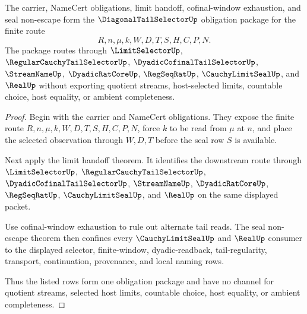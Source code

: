 \begin{theorem}
\label{thm:diagonal-tail-selector-obligation-closure-package}
The carrier, NameCert obligations, limit handoff, cofinal-window exhaustion,
and seal non-escape form the $\DiagonalTailSelectorUp$ obligation package for
the finite route
$$
R,n,\mu,k,W,D,T,S,H,C,P,N.
$$
The package routes through $\LimitSelectorUp$,
$\RegularCauchyTailSelectorUp$, $\DyadicCofinalTailSelectorUp$,
$\StreamNameUp$, $\DyadicRatCoreUp$, $\RegSeqRatUp$,
$\CauchyLimitSealUp$, and $\RealUp$ without exporting quotient streams,
host-selected limits, countable choice, host equality, or ambient completeness.
\end{theorem}
\begin{proof}
Begin with the carrier and NameCert obligations. They expose the finite route
$R,n,\mu,k,W,D,T,S,H,C,P,N$, force $k$ to be read from $\mu$ at $n$, and place
the selected observation through $W,D,T$ before the seal row $S$ is available.

Next apply the limit handoff theorem. It identifies the downstream route
through $\LimitSelectorUp$, $\RegularCauchyTailSelectorUp$,
$\DyadicCofinalTailSelectorUp$, $\StreamNameUp$, $\DyadicRatCoreUp$,
$\RegSeqRatUp$, $\CauchyLimitSealUp$, and $\RealUp$ on the same displayed
packet.

Use cofinal-window exhaustion to rule out alternate tail reads. The seal
non-escape theorem then confines every $\CauchyLimitSealUp$ and $\RealUp$
consumer to the displayed selector, finite-window, dyadic-readback,
tail-regularity, transport, continuation, provenance, and local naming rows.

Thus the listed rows form one obligation package and have no channel for
quotient streams, selected host limits, countable choice, host equality, or
ambient completeness.
\end{proof}

